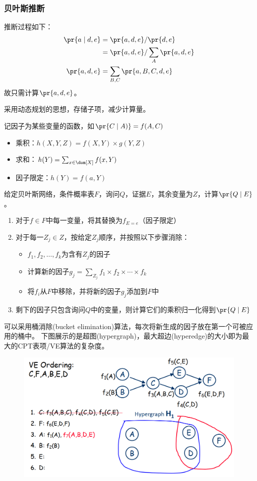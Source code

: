 \subsubsection{贝叶斯推断}
推断过程如下：
\[\begin{aligned}
\pr{a\mid d,e}&=\pr{a,d,e}/\pr{d,e}\\
&=\pr{a,d,e}/\sum_{A}\pr{a,d,e}\\
\pr{a,d,e}&=\sum_{B,C}\pr{a,B,C,d,e}
\end{aligned}\]
故只需计算$\pr{a,d,e}$。

采用动态规划的思想，存储子项，减少计算量。

记因子为某些变量的函数，如$\pr{C\mid A)}=f(A,C)$
\begin{itemize}
	\item 乘积：$h(X,Y,Z)=f(X,Y)\times g(Y,Z)$
	\item 求和：$h(Y)=\sum_{x\in\dom[X]}f(x,Y)$
	\item 因子限定：$h(Y)=f(a,Y)$
\end{itemize}

\begin{myalgorithm}
给定贝叶斯网络，条件概率表$F$，询问$Q$，证据$E$，其余变量为$Z$，计算$\pr{Q\mid E}$。
\begin{enumerate}
	\item 对于$f\in F$中每一变量，将其替换为$f_{E=e}$（因子限定）
	\item 对于每一$Z_j\in Z$，按给定$Z_j$顺序，并按照以下步骤消除：
	\begin{itemize}
		\item $f_1,f_2,\ldots,f_k$为含有$Z_j$的因子
		\item 计算新的因子$g_j=\sum_{Z_j}f_1\times f_2\times\cdots\times f_k$
		\item 将$f_i$从$F$中移除，并将新的因子$g_j$添加到$F$中
	\end{itemize}
	\item 剩下的因子只包含询问$Q$中的变量，则计算它们的乘积归一化得到$\pr{Q\mid E}$
\end{enumerate}
\end{myalgorithm}

可以采用桶消除(bucket elimination)算法，每次将新生成的因子放在第一个可被应用的桶中。
下图展示的是超图(hypergraph)，最大超边(hyperedge)的大小即为最大的CPT表项/VE算法的复杂度。
\begin{figure}[H]
\centering
\includegraphics[width=0.8\linewidth]{fig/bucket_elimination.png}
\end{figure}

